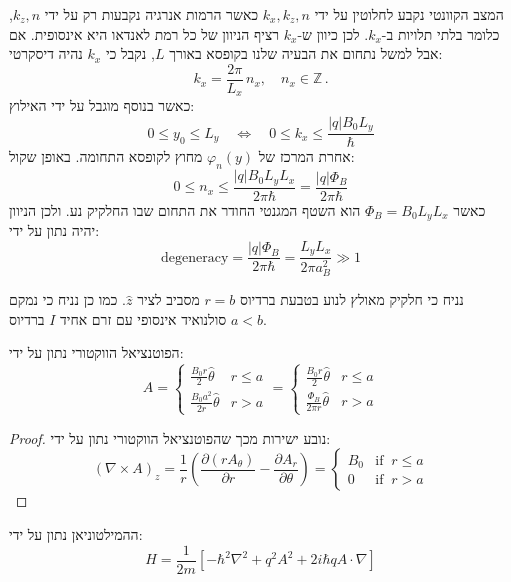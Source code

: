 \documentclass{tstextbook}
\begin{document}
\begin{remark}
המצב הקוונטי נקבע לחלוטין על ידי \(k_{x},k_{z},n\) כאשר הרמות אנרגיה נקבעות רק על ידי \(k_{z},n\), כלומר בלתי תלויות ב-\(k_{x}\). לכן כיוון ש-\(k_{x}\) רציף הניוון של כל רמת לאנדאו היא אינסופית. אם אבל למשל נתחום את הבעיה שלנו בקופסא באורך \(L\), נקבל כי \(k_{x}\) נהיה דיסקרטי:
$$k_{x}=\frac{2\pi}{L_{x}}\,n_{x},\quad n_{x}\in\mathbb{Z}\,.$$
כאשר בנוסף מוגבל על ידי האילוץ:
$$0\leq y_{0}\leq L_{y}\quad\Leftrightarrow\quad0\leq k_{x}\leq{\frac{|q|B_{0}L_{y}}{\hbar}}$$
אחרת המרכז של \(\varphi_{n}(y)\) מחוץ לקופסא התחומה. באופן שקול:
$$0\leq n_{x}\leq\frac{|q|B_{0}L_{y}L_{x}}{2\pi\hbar}=\frac{|q|\Phi_{B}}{2\pi\hbar}$$
כאשר \(\Phi_{B}=B_{0}L_{y}L_{x}\) הוא השטף המגנטי החודר את התחום שבו החלקיק נע. ולכן הניוון יהיה נתון על ידי:
$$\mathrm{degeneracy}=\frac{|q|\Phi_{B}}{2\pi\hbar}=\frac{L_{y}L_{x}}{2\pi a_{B}^{2}}\gg1$$

\end{remark}
\begin{definition}
נניח כי חלקיק מאולץ לנוע בטבעת ברדיוס \(r=b\) מסביב לציר \(\hat{z}\). כמו כן נניח כי נמקם סולנואיד אינסופי עם זרם אחיד \(I\) ברדיוס \(a< b\).

\end{definition}
\begin{lemma}
הפוטנציאל הווקטורי נתון על ידי:
$$A=\begin{cases} \frac{B_{0}r}{2}\hat{\theta} & r\leq a\\\frac{B_{0}a^{2}}{2r}\hat{\theta} & r>a\end{cases}=\begin{cases} \frac{B_{0}r}{2}\hat{\theta} & r\leq a\\\frac{\Phi_{B}}{2\pi r}\hat{\theta} & r>a
\end{cases}$$

\end{lemma}
\begin{proof}
נובע ישירות מכך שהפוטנציאל הווקטורי נתון על ידי:
$$(\nabla\times A)_{z}={\frac{1}{r}}\left({\frac{\partial(r A_{\theta})}{\partial r}}-{\frac{\partial A_{r}}{\partial\theta}}\right)={\begin{cases}B_{0}&{\mathrm{if}}\;\;r\leq a\\ 0&{\mathrm{if}}\;\;r>a\end{cases}}$$

\end{proof}
\begin{proposition}
ההמילטוניאן נתון על ידי:
$$H=\frac{1}{2m}\left[-\hbar^{2}\nabla^{2}+q^{2}A^{2}+2i\hbar q A\cdot\nabla\right]$$

\end{proposition}
\end{document}
